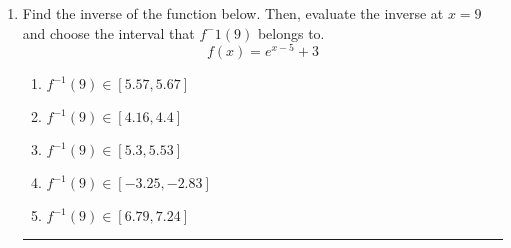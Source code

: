 \documentclass[14pt]{extbook}
\newcommand{\litem}[1]{\item#1\hspace*{-1cm}\rule{\textwidth}{0.4pt}}
\begin{document}
\begin{enumerate}
{\begin{enumerate}[label=\Alph*.]
\end{enumerate} }
\litem{
Find the inverse of the function below. Then, evaluate the inverse at $x = 9$ and choose the interval that $f^-1(9)$ belongs to.\[ f(x) = e^{x-5}+3 \]\begin{enumerate}[label=\Alph*.]
\item \( f^{-1}(9) \in [5.57, 5.67] \)
\item \( f^{-1}(9) \in [4.16, 4.4] \)
\item \( f^{-1}(9) \in [5.3, 5.53] \)
\item \( f^{-1}(9) \in [-3.25, -2.83] \)
\item \( f^{-1}(9) \in [6.79, 7.24] \)

\end{enumerate} }
\end{enumerate}
\end{document}
